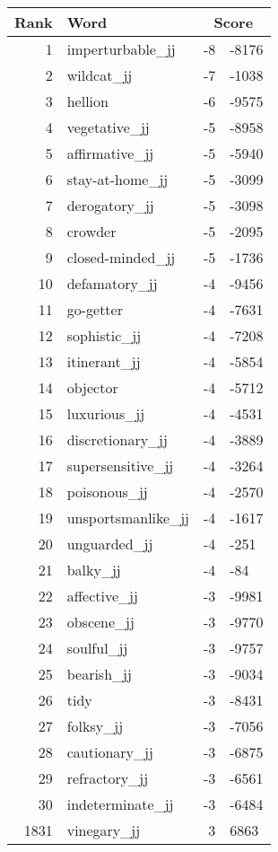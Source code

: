 \begin{longtable}[!htbp]{| rlr@{.}l |}
    \hline
    \textbf{Rank} & \textbf{Word} & \multicolumn{2}{c|}{\textbf{Score}} \\
    \hline
    \endhead
    1 & imperturbable\_jj & -8 & -8176 \\
    2 & wildcat\_jj & -7 & -1038 \\
    3 & hellion & -6 & -9575 \\
    4 & vegetative\_jj & -5 & -8958 \\
    5 & affirmative\_jj & -5 & -5940 \\
    6 & stay-at-home\_jj & -5 & -3099 \\
    7 & derogatory\_jj & -5 & -3098 \\
    8 & crowder & -5 & -2095 \\
    9 & closed-minded\_jj & -5 & -1736 \\
    10 & defamatory\_jj & -4 & -9456 \\
    11 & go-getter & -4 & -7631 \\
    12 & sophistic\_jj & -4 & -7208 \\
    13 & itinerant\_jj & -4 & -5854 \\
    14 & objector & -4 & -5712 \\
    15 & luxurious\_jj & -4 & -4531 \\
    16 & discretionary\_jj & -4 & -3889 \\
    17 & supersensitive\_jj & -4 & -3264 \\
    18 & poisonous\_jj & -4 & -2570 \\
    19 & unsportsmanlike\_jj & -4 & -1617 \\
    20 & unguarded\_jj & -4 & -251 \\
    21 & balky\_jj & -4 & -84 \\
    22 & affective\_jj & -3 & -9981 \\
    23 & obscene\_jj & -3 & -9770 \\
    24 & soulful\_jj & -3 & -9757 \\
    25 & bearish\_jj & -3 & -9034 \\
    26 & tidy & -3 & -8431 \\
    27 & folksy\_jj & -3 & -7056 \\
    28 & cautionary\_jj & -3 & -6875 \\
    29 & refractory\_jj & -3 & -6561 \\
    30 & indeterminate\_jj & -3 & -6484 \\
    1831 & vinegary\_jj & 3 & 6863 \\

\end{longtable}
